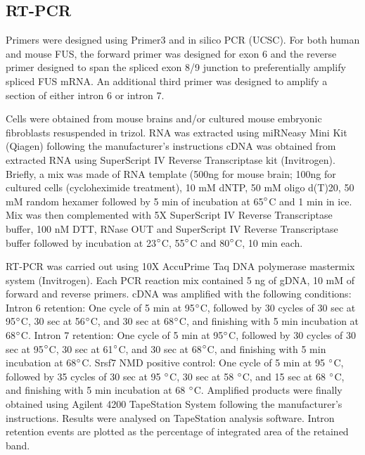 \subsection{RT-PCR}
Primers were designed using Primer3 \citep{Koressaar2007} and in silico PCR (UCSC). 
For both human and mouse FUS, the forward primer was designed for exon 6 and the reverse primer designed to span the spliced exon 8/9 junction to preferentially amplify spliced FUS mRNA. 
An additional third primer was designed to amplify a section of either intron 6 or intron 7.

Cells were obtained from mouse brains and/or cultured mouse embryonic fibroblasts resuspended in trizol. 
RNA was extracted using miRNeasy Mini Kit (Qiagen) following the manufacturer's instructions %
cDNA was obtained from extracted RNA using SuperScript IV Reverse Transcriptase kit (Invitrogen). 
Briefly, a mix was made of RNA template (500ng for mouse brain; 100ng for cultured cells (cycloheximide treatment), 10 mM dNTP, 50 mM oligo d(T)20, 50 mM random hexamer followed by 5 min of incubation at 65$\degree$C and 1 min in ice. Mix was then complemented with 5X SuperScript IV Reverse Transcriptase buffer, 100 nM DTT, RNase OUT and SuperScript IV Reverse Transcriptase buffer followed by incubation at 23$\degree$C, 55$\degree$C and 80$\degree$C, 10 min each. 

RT-PCR was carried out using 10X AccuPrime Taq DNA polymerase mastermix system (Invitrogen). 
Each PCR reaction mix contained 5 ng of gDNA, 10 mM of forward and reverse primers. cDNA was amplified with the following conditions:
Intron 6 retention: One cycle of 5 min at 95$\degree$C, followed by 30 cycles of 30 sec at 95$\degree$C, 30 sec at 56$\degree$C, and 30 sec at 68$\degree$C, and finishing with 5 min incubation at 68$\degree$C.
Intron 7 retention: One cycle of 5 min at 95$\degree$C, followed by 30 cycles of 30 sec at 95$\degree$C, 30 sec at 61$\degree$C, and 30 sec at 68$\degree$C, and finishing with 5 min incubation at 68$\degree$C.
Srsf7 NMD positive control: One cycle of 5 min at 95 $\degree$C, followed by 35 cycles of 30 sec at 95 $\degree$C, 30 sec at 58 $\degree$C, and 15 sec at 68 $\degree$C, and finishing with 5 min incubation at 68 $\degree$C.
Amplified products were finally obtained using Agilent 4200 TapeStation System following the manufacturer's instructions. Results were analysed on TapeStation analysis software.
Intron retention events are plotted  as the percentage of integrated area of the retained band.



